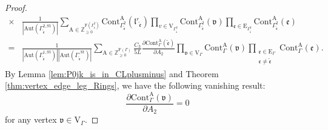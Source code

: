 \documentclass[10pt,a4paper]{amsart}
\begin{document}
\begin{proof}
\begin{equation}
\begin{aligned}
\times&\frac{1}{|\mathrm{Aut}(\Gamma_{\tilde{\mathfrak{e}}}^{2,\mathrm{St}})|} \sum_{\mathrm{A} \in \mathbb{Z}_{\geq 0}^{\mathrm{F}({\Gamma_{\tilde{\mathfrak{e}}}^2})}} \mathrm{Cont}_{\Gamma_{\tilde{\mathfrak{e}}}^2}^{\mathrm{A}}(\mathfrak{l}'_{\tilde{\mathfrak{e}}}) \prod_{v \in \mathrm{V}_{\Gamma_{\tilde{\mathfrak{e}}}^2}} \mathrm{Cont}_{\Gamma_{\tilde{\mathfrak{e}}}^2}^{\mathrm{A}}(\mathfrak{v}) \prod_{\mathfrak{e} \in \mathrm{E}_{\Gamma_{\tilde{\mathfrak{e}}}^2}} \mathrm{Cont}_{\Gamma_{\tilde{\mathfrak{e}}}^2}^{\mathrm{A}}(\mathfrak{e})\\
=&\frac{1}{|\mathrm{Aut}(\Gamma_{\tilde{\mathfrak{e}}}^{1,\mathrm{St}})||\mathrm{Aut}(\Gamma_{\tilde{\mathfrak{e}}}^{,\mathrm{St}})|} \sum_{\mathrm{A} \in \mathbb{Z}_{\geq 0}^{\mathrm{F}(\Gamma)}}\frac{C_{3}}{5L}\frac{\partial \mathrm{Cont}_{\Gamma}^{\mathrm{A}}(\tilde{\mathfrak{e}}) }{\partial A_2} \prod_{\mathfrak{v} \in \mathrm{V}_{\Gamma}} \mathrm{Cont}_{\Gamma}^{\mathrm{A}}(\mathfrak{v}) \prod_{\substack{
\mathfrak{e} \in \mathrm{E}_{\Gamma} \\ \mathfrak{e}\neq \tilde{\mathfrak{e}}}} \mathrm{Cont}_{\Gamma}^{\mathrm{A}}(\mathfrak{e}).
\end{aligned}
\end{equation}
By Lemma \ref{lem:P0jk_is_in_CLplusminus} and Theorem \ref{thm:vertex_edge_leg_Rings}, we have the following vanishing result:
\begin{equation*}
\frac{\partial \mathrm{Cont}_{\Gamma}^{\mathrm{A}}(\mathfrak{v}) }{\partial A_2}=0
\end{equation*}
for any vertex $\mathfrak{v}\in\mathrm{V}_{\Gamma} $.


\end{proof}
\end{document}
